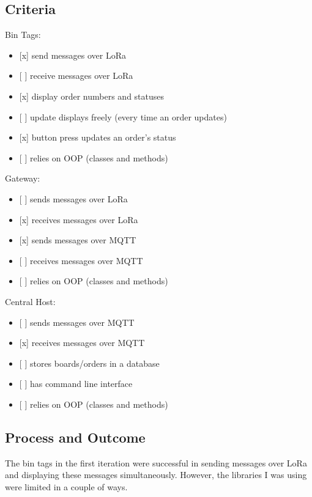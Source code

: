 \documentclass{article}
\begin{document}
\subsection{Criteria}\label{criteria-1}

\noindent
Bin Tags:

\begin{itemize}
\item
  {[}x{]} send messages over LoRa
\item
  {[} {]} receive messages over LoRa
\item
  {[}x{]} display order numbers and statuses
\item
  {[} {]} update displays freely (every time an order updates)
\item
  {[}x{]} button press updates an order's status
\item
  {[} {]} relies on OOP (classes and methods)
\end{itemize}

\noindent
Gateway:

\begin{itemize}
\item
  {[} {]} sends messages over LoRa
\item
  {[}x{]} receives messages over LoRa
\item
  {[}x{]} sends messages over MQTT
\item
  {[} {]} receives messages over MQTT
\item
  {[} {]} relies on OOP (classes and methods)
\end{itemize}

\noindent
Central Host:

\begin{itemize}
\item
  {[} {]} sends messages over MQTT
\item
  {[}x{]} receives messages over MQTT
\item
  {[} {]} stores boards/orders in a database
\item
  {[} {]} has command line interface
\item
  {[} {]} relies on OOP (classes and methods)
\end{itemize}

\subsection{Process and Outcome}\label{process-and-outcome}

The bin tags in the first iteration were successful in sending messages
over LoRa and displaying these messages simultaneously. However, the
libraries I was using were limited in a couple of ways.
\end{document}
